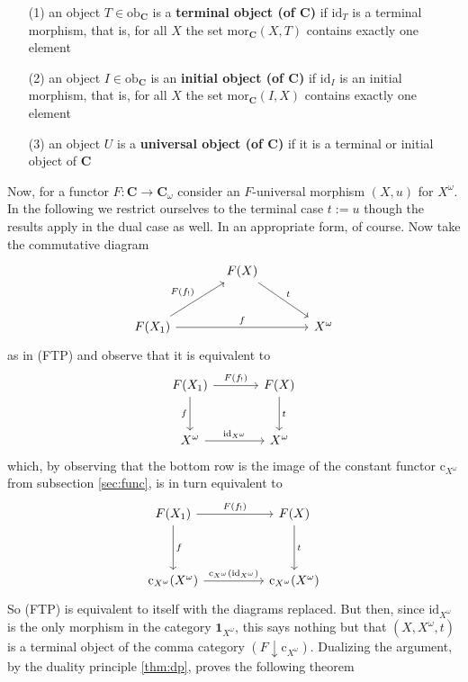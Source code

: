 \begin{enumerate}
\item[(1)]
an object $T \in \mathrm{ob}_{\mathbf{C}}$ is a \textbf{terminal object (of $\mathbf{C}$)} if $\mathrm{id}_{T}$ is a terminal morphism, that is, for all $X$ the set $\mathrm{mor}_{\mathbf{C}}(X,T)$ contains exactly one element
\item[(2)]
an object $I \in \mathrm{ob}_{\mathbf{C}}$ is an \textbf{initial object (of $\mathbf{C}$)} if $\mathrm{id}_{I}$ is an initial morphism, that is, for all $X$ the set $\mathrm{mor}_{\mathbf{C}}(I,X)$ contains exactly one element
\item[(3)]
an object $U$ is a \textbf{universal object (of $\mathbf{C}$)} if it is a terminal or initial object of $\mathbf{C}$
\end{enumerate}
Now, for a functor $F \colon \mathbf{C} \rightarrow \mathbf{C}_{\omega}$ consider an $F$-universal morphism $(X,u)$ for $X^{\omega}$. In the following we restrict ourselves to the terminal case $t := u$ though the results apply in the dual case as well. In an appropriate form, of course. Now take the commutative diagram
\[
\begin{tikzcd}[sep=large]
  &
  F(X)
  \arrow{rd}{t}
  &
  \\
  F(X_{1})
  \arrow{ru}{F(f_{!})}
  \arrow{rr}{f}
  &
  &
  X^{\omega}
\end{tikzcd}
\]
as in (FTP) and observe that it is equivalent to
\[
\begin{tikzcd}[sep=large]
  F(X_{1})
  \arrow[swap]{d}{f}
  \arrow{r}{F(f_{!})}
  &
  F(X)
  \arrow{d}{t}
  \\
  X^{\omega}
  \arrow{r}{\mathrm{id}_{X^{\omega}}}
  &
  X^{\omega}
\end{tikzcd}
\]
which, by observing that the bottom row is the image of the constant functor $\mathrm{c}_{X^{\omega}}$ from subsection \ref{sec:func}, is in turn equivalent to
\[
\begin{tikzcd}[sep=huge]
  F(X_{1})
  \arrow{r}{F(f_{!})}
  \arrow{d}{f}
  &
  F(X)
  \arrow{d}{t}
  \\
  \mathrm{c}_{X^{\omega}}(X^{\omega})
  \arrow{r}{\mathrm{c}_{X^{\omega}}(\mathrm{id}_{X^{\omega}})}
  &
  \mathrm{c}_{X^{\omega}}(X^{\omega})
\end{tikzcd}
\]
So (FTP) is equivalent to itself with the diagrams replaced. But then, since $\mathrm{id}_{X^{\omega}}$ is the only morphism in the category $\mathbf{1}_{X^{\omega}}$, this says nothing but that $(X,X^{\omega},t)$ is a terminal object of the comma category $(F \downarrow \mathrm{c}_{X^{\omega}})$. Dualizing the argument, by the duality principle \ref{thm:dp}, proves the following theorem
